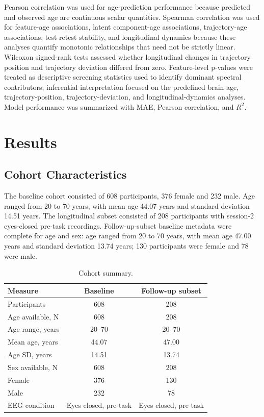\documentclass[journal]{IEEEtran}
\begin{document}
Pearson correlation was used for age-prediction performance because predicted and observed age are continuous scalar quantities. Spearman correlation was used for feature-age associations, latent component-age associations, trajectory-age associations, test-retest stability, and longitudinal dynamics because these analyses quantify monotonic relationships that need not be strictly linear. Wilcoxon signed-rank tests assessed whether longitudinal changes in trajectory position and trajectory deviation differed from zero. Feature-level p-values were treated as descriptive screening statistics used to identify dominant spectral contributors; inferential interpretation focused on the predefined brain-age, trajectory-position, trajectory-deviation, and longitudinal-dynamics analyses. Model performance was summarized with MAE, Pearson correlation, and $R^2$.

\section{Results}

\subsection{Cohort Characteristics}

The baseline cohort consisted of 608 participants, 376 female and 232 male. Age ranged from 20 to 70 years, with mean age 44.07 years and standard deviation 14.51 years. The longitudinal subset consisted of 208 participants with session-2 eyes-closed pre-task recordings. Follow-up-subset baseline metadata were complete for age and sex: age ranged from 20 to 70 years, with mean age 47.00 years and standard deviation 13.74 years; 130 participants were female and 78 were male.

\begin{table}[!t]
\centering
\caption{Cohort summary.}
\label{tab:cohort}
\begin{tabular}{lcc}
\toprule
Measure & Baseline & Follow-up subset \\
\midrule
Participants & 608 & 208 \\
Age available, N & 608 & 208 \\
Age range, years & 20--70 & 20--70 \\
Mean age, years & 44.07 & 47.00 \\
Age SD, years & 14.51 & 13.74 \\
Sex available, N & 608 & 208 \\
Female & 376 & 130 \\
Male & 232 & 78 \\
EEG condition & Eyes closed, pre-task & Eyes closed, pre-task \\
\bottomrule
\end{tabular}
\end{table}
\end{document}
